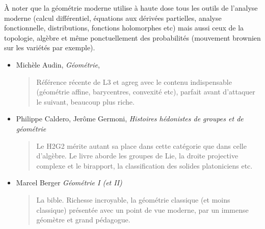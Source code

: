 \documentclass{article}
\begin{document}
À noter que la géométrie moderne utilise à haute dose tous les outils de l'analyse moderne (calcul différentiel, équations aux dérivées partielles, analyse fonctionnelle, distributions, fonctions holomorphes etc) mais aussi ceux de la topologie, algèbre et même ponctuellement des probabilités (mouvement brownien sur les variétés par exemple).
\begin{mdframed}
\begin{itemize}
\item  Michèle Audin, \emph{Géométrie}, 
\begin{quote}
Référence récente de L3 et agreg avec le contenu indispensable (géométrie affine, barycentres, convexité etc), parfait avant d'attaquer le suivant, beaucoup plus riche.
\end{quote}
\end{itemize}
\end{mdframed}
\begin{itemize}
\item Philippe Caldero, Jerôme Germoni, \emph{Histoires hédonistes de groupes et de géométrie}
\begin{quote}
Le H2G2 mérite autant sa place dans cette catégorie que dans celle d'algèbre. Le livre aborde les groupes de Lie, la droite projective complexe et le birapport, la classification des solides platoniciens etc.
\end{quote}
\item Marcel Berger \emph{Géométrie I (et II)}
\begin{quote}
La bible. Richesse incroyable, la géométrie classique (et moins classique) présentée avec un point de vue moderne, par un immense géomètre et grand pédagogue.
\end{quote}
\end{itemize}
\end{document}
